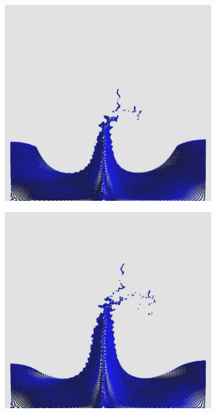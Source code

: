 \documentclass[12pt,a4paper,dvipsnames]{article}
\begin{document}
\begin{figure}[!ht]
\begin{subfigure}[!h]{0.3\textwidth}
	\end{subfigure}
	\begin{subfigure}[!h]{0.3\textwidth} \centering
		\includegraphics[width=\textwidth]{DDB/DDB-04.jpg}
	\end{subfigure}
	\begin{subfigure}[!h]{0.3\textwidth} \centering
		\includegraphics[width=\textwidth]{DDB/DDB-05.jpg}

\end{subfigure}
\end{figure}
\end{document}
